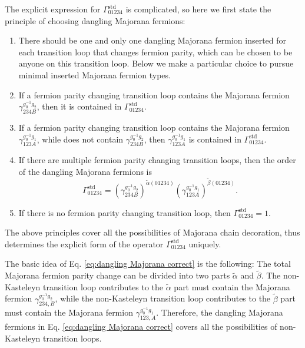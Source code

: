 \documentclass[%
 reprint,
 amsmath,amssymb,
 aps,
prb,
]{revtex4-2}
\begin{document}
The explicit expression for $\Gamma^{\mathrm{std}}_{01234}$ is complicated, so here we first state the principle of choosing dangling Majorana fermions: 
\begin{enumerate}
\item There should be one and only one dangling Majorana fermion inserted for each transition loop that changes fermion parity, which can be chosen to be anyone on this transition loop.
Below we make a particular choice to pursue minimal inserted Majorana fermion types.
\item If a fermion parity changing transition loop contains the Majorana fermion $\gamma^{g^{-1}_0 g_2}_{234B}$, then it is contained in $\Gamma^{\mathrm{std}}_{01234}$.
\item If a fermion parity changing transition loop contains the Majorana fermion $\gamma^{g^{-1}_0 g_1}_{123A}$, while does not contain $\gamma^{g^{-1}_0 g_2}_{234B}$, then $\gamma^{g^{-1}_0 g_1}_{123A}$ is contained in $\Gamma^{\mathrm{std}}_{01234}$.
\item If there are multiple fermion parity changing transition loops, then the order of the dangling Majorana fermions is 
\begin{equation}
\Gamma^{\mathrm{std}}_{01234} = \left( \gamma^{g^{-1}_0 g_2}_{234B} \right) ^{\tilde{\alpha}(01234)} \left( \gamma^{g^{-1}_0 g_1}_{123A} \right) ^{\tilde{\beta}(01234)} .\label{eq:dangling Majorana correct}
\end{equation}
\item If there is no fermion parity changing transition loop, then $\Gamma^{\mathrm{std}}_{01234} = 1$.
\end{enumerate}
The above principles cover all the possibilities of Majorana chain decoration, thus determines the explicit form of the operator $\Gamma^{\mathrm{std}}_{01234}$ uniquely.

The basic idea of Eq. \eqref{eq:dangling Majorana correct} is the following: The total Majorana fermion parity change can be divided into two parts $\tilde{\alpha}$ and $\tilde{\beta}$. The non-Kasteleyn transition loop contributes to the $\tilde{\alpha}$ part must contain the Majorana fermion $\gamma _{234,B}^{g^{-1}_0 g_2}$, while the non-Kasteleyn transition loop contributes to the $\tilde{\beta}$ part must contain the Majorana fermion $\gamma _{123,A}^{g^{-1}_0 g_1}$.
Therefore, the dangling Majorana fermions in Eq. \eqref{eq:dangling Majorana correct} covers all the possibilities of non-Kasteleyn transition loops.
\end{document}
